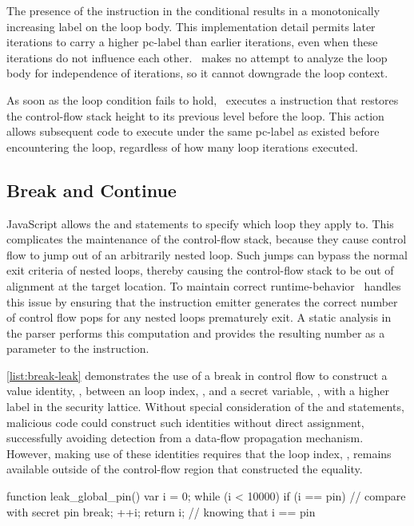 The presence of the \join instruction in the conditional results in a monotonically increasing label on the loop body.
This implementation detail permits later iterations to carry a higher pc-label than earlier iterations, even when these iterations do not influence each other.
\FlowCore\ makes no attempt to analyze the loop body for independence of iterations, so it cannot downgrade the loop context.

As soon as the loop condition fails to hold, \FlowCore\ executes a \popj instruction that restores the control-flow stack height to its previous level before the loop.
This action allows subsequent code to execute under the same pc-label as existed before encountering the loop, regardless of how many loop iterations executed.

\subsection{Break and Continue}
\label{sec:break-and-continue}

JavaScript allows the  and  statements to specify which loop they apply to.
This complicates the maintenance of the control-flow stack, because they cause control flow to jump out of an arbitrarily nested loop.
Such jumps can bypass the normal exit criteria of nested loops, thereby causing the control-flow stack to be out of alignment at the target location.
To maintain correct runtime-behavior \FlowCore\ handles this issue by ensuring that the instruction emitter generates the correct number of control flow pops for any nested loops prematurely exit.
A static analysis in the parser performs this computation and provides the resulting number as a parameter to the \popj instruction.

\autoref{list:break-leak} demonstrates the use of a break in control flow to construct a value identity, , between an loop index, , and a secret variable, , with a higher label in the security lattice.
Without special consideration of the  and  statements, malicious code could construct such identities without direct assignment, successfully avoiding detection from a data-flow propagation mechanism.
However, making use of these identities requires that the loop index, , remains available outside of the control-flow region that constructed the equality.

\begin{jscode}
function leak_global_pin() {
  var i = 0;
  while (i < 10000) {
    if (i == pin) {   // compare with secret pin
      break;
    }
    ++i;
  }
  return i; // knowing that i == pin
}
\end{jscode}

